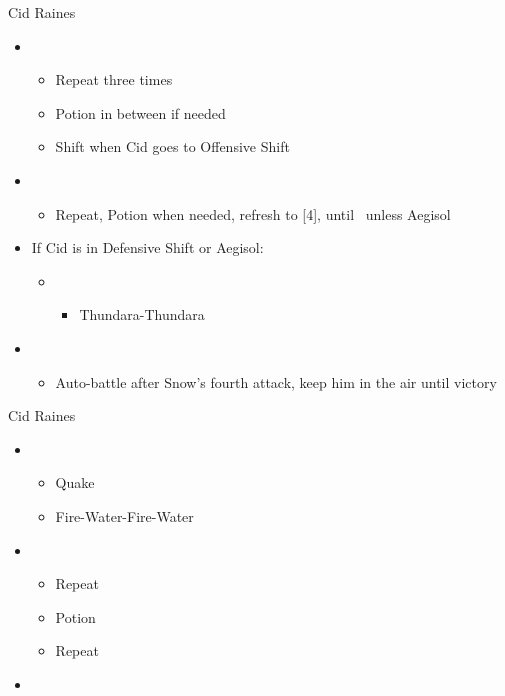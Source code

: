 \begin{paracol}{2}
\begin{battle}{Cid Raines}
\begin{itemize}
\begin{itemize}
			      \end{itemize}
			\item \second
			      \begin{itemize}
				      \item Repeat three times
				      \item Potion in between if needed
				      \item Shift when Cid goes to Offensive Shift
			      \end{itemize}
			\item \third
			      \begin{itemize}
				      \item Repeat, Potion when needed, refresh to [4], until \stagger\ unless Aegisol
			      \end{itemize}
			\item If Cid is in Defensive Shift or Aegisol:
			      \begin{itemize}
				      \item \second
				            \begin{itemize}
					            \item Thundara-Thundara
				            \end{itemize}
			      \end{itemize}
			\item \sixth
			      \begin{itemize}
				      \item Auto-battle after Snow's fourth attack, keep him in the air until victory
			      \end{itemize}
		\end{itemize}
	\end{battle}
	\switchcolumn
	\begin{battle}{Cid Raines}
\begin{itemize}
    \item \first
    \begin{itemize}
        \item Quake
        \item Fire-Water-Fire-Water
    \end{itemize}
    \item \third
    \begin{itemize}
        \item Repeat
        \item Potion
        \item Repeat
    \end{itemize}
    \item \fourth

\end{itemize}
\end{battle}
\end{paracol}
